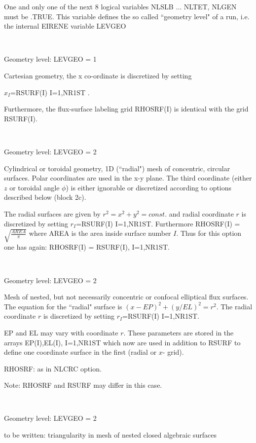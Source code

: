 One and only one of the next 8 logical variables NLSLB $\dots$ NLTET, NLGEN must be .TRUE.
This variable defines the so called ``geometry level" of a run, i.e. the internal EIRENE variable LEVGEO

\begin{list}{ }{}
\item[{\bf NLSLB = .TRUE. }] ~

Geometry level: LEVGEO = 1

Cartesian geometry, the x co-ordinate is discretized by setting

$x_I$=RSURF(I) I=1,NR1ST .

Furthermore,
the flux-surface labeling grid RHOSRF(I) is identical with
the grid RSURF(I).
\item[{\bf NLCRC = .TRUE. }] ~

Geometry level: LEVGEO = 2

Cylindrical or toroidal geometry,
1D (``radial") mesh of concentric, circular surfaces. Polar coordinates are
used in the x-y plane. The third coordinate (either $z$ or toroidal angle $\phi$)
is either ignorable or discretized according to options described below (block 2c).

The radial surfaces are given by
$r^2 = x^2 + y^2 = const.$ and
radial coordinate $r$ is discretized by setting $r_I$=RSURF(I) I=1,NR1ST.
Furthermore RHOSRF(I) = $\sqrt{ \frac{AREA}{\pi} }$ where
AREA is the area inside surface
number $I$.
Thus for this option one has again: RHOSRF(I) = RSURF(I), I=1,NR1ST.
\item[{\bf NLELL = .TRUE. }] ~

Geometry level: LEVGEO = 2

Mesh of nested, but not necessarily concentric or confocal elliptical
flux surfaces.
The equation for the ``radial" surface
is $(x - EP)^2 + (  y/EL )^2 = r^2$.
The radial coordinate $r$ is discretized by setting
$r_I$=RSURF(I) I=1,NR1ST.

EP and EL may vary with coordinate $r$. These parameters are stored in the
arrays EP(I),EL(I), I=1,NR1ST which now are used in addition to
RSURF to define one coordinate surface in the first (radial or $x$- grid).

RHOSRF: as in NLCRC option.

Note: RHOSRF and RSURF may differ in this case.
\item[{\bf NLTRI = .TRUE. }] ~

Geometry level: LEVGEO = 2

to be written: triangularity in mesh of nested closed algebraic
surfaces
\item[{\bf NLPLG = .TRUE. }] ~


\end{list}
